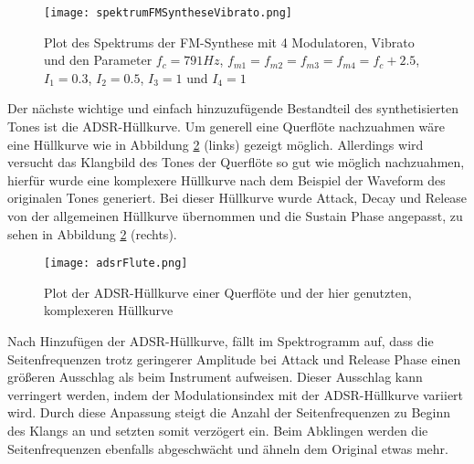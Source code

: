 \begin{figure} [ht]
\centering
  \texttt{[image: spektrumFMSyntheseVibrato.png]}
\caption{Plot des Spektrums der FM-Synthese mit 4 Modulatoren, Vibrato und den Parameter $f_c = 791 Hz$, $f_{m1} = f_{m2} = f_{m3} = f_{m4} = f_c + 2.5$, $I_1 = 0.3$, $I_2 = 0.5$, $I_3 = 1$ und $I_4 = 1$}
\label{fig:spektrumFMSyntheseVibrato}
\end{figure}

Der nächste wichtige und einfach hinzuzufügende Bestandteil des synthetisierten Tones ist die ADSR-Hüllkurve. Um generell eine Querflöte nachzuahmen wäre eine Hüllkurve wie in Abbildung \ref{fig:adsrFlute} (links) gezeigt möglich. Allerdings wird versucht das Klangbild des Tones der Querflöte so gut wie möglich nachzuahmen, hierfür wurde eine komplexere Hüllkurve nach dem Beispiel der Waveform des originalen Tones generiert. Bei dieser Hüllkurve wurde Attack, Decay und Release von der allgemeinen Hüllkurve übernommen und die Sustain Phase angepasst, zu sehen in Abbildung \ref{fig:adsrFlute} (rechts). 

\begin{figure} [ht]
\centering
  \texttt{[image: adsrFlute.png]}
\caption{Plot der ADSR-Hüllkurve einer Querflöte und der hier genutzten, komplexeren Hüllkurve}
\label{fig:adsrFlute}
\end{figure}

Nach Hinzufügen der ADSR-Hüllkurve, fällt im Spektrogramm auf, dass die Seitenfrequenzen trotz geringerer Amplitude bei Attack und Release Phase einen größeren Ausschlag als beim Instrument aufweisen. Dieser Ausschlag kann verringert werden, indem der Modulationsindex mit der ADSR-Hüllkurve variiert wird. Durch diese Anpassung steigt die Anzahl der Seitenfrequenzen zu Beginn des Klangs an und setzten somit verzögert ein. Beim Abklingen werden die Seitenfrequenzen ebenfalls abgeschwächt und ähneln dem Original etwas mehr.

